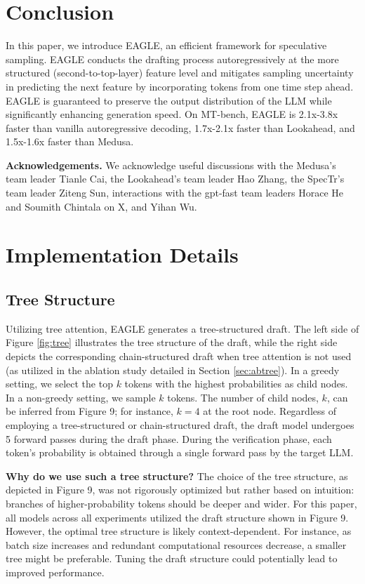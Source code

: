 \documentclass{article}
\theoremstyle{plain}
\theoremstyle{definition}
\theoremstyle{remark}
\begin{document}
\section{Conclusion}
In this paper, we introduce EAGLE, an efficient framework for speculative sampling. EAGLE conducts the drafting process autoregressively at the more structured (second-to-top-layer) feature level and mitigates sampling uncertainty in predicting the next feature by incorporating tokens from one time step ahead. EAGLE is guaranteed to preserve the output distribution of the LLM while significantly enhancing generation speed. On MT-bench, EAGLE is 2.1x-3.8x faster than vanilla autoregressive decoding, 1.7x-2.1x faster than Lookahead, and 1.5x-1.6x faster than Medusa.

\textbf{Acknowledgements.} We acknowledge useful discussions with the Medusa's team leader Tianle Cai, the Lookahead's team leader Hao Zhang, the SpecTr's team leader Ziteng Sun, interactions with the gpt-fast team leaders Horace He and Soumith Chintala on X, and Yihan Wu.






\newpage
\appendix


\onecolumn
\section{Implementation Details}
\subsection{Tree Structure}
\label{ap:tree}
Utilizing tree attention, EAGLE generates a tree-structured draft. The left side of Figure \ref{fig:tree} illustrates the tree structure of the draft, while the right side depicts the corresponding chain-structured draft when tree attention is not used (as utilized in the ablation study detailed in Section \ref{sec:abtree}). In a greedy setting, we select the top $k$ tokens with the highest probabilities as child nodes. In a non-greedy setting, we sample $k$ tokens. The number of child nodes, $k$, can be inferred from Figure 9; for instance, $k=4$ at the root node. 
Regardless of employing a tree-structured or chain-structured draft, the draft model undergoes 5 forward passes during the draft phase.
During the verification phase, each token's probability is obtained through a single forward pass by the target LLM.


\textbf{Why do we use such a tree structure?} The choice of the tree structure, as depicted in Figure 9, was not rigorously optimized but rather based on intuition: branches of higher-probability tokens should be deeper and wider. For this paper, all models across all experiments utilized the draft structure shown in Figure 9. However, the optimal tree structure is likely context-dependent. For instance, as batch size increases and redundant computational resources decrease, a smaller tree might be preferable. Tuning the draft structure could potentially lead to improved performance.
\end{document}

